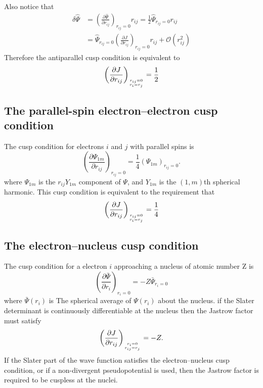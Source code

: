 \documentclass[12pt]{article}
\begin{document}
Also notice that 
\begin{equation}
    \begin{split}
        \delta\hat{\Psi}&=\left(\frac{\partial \hat{\Psi}}{\partial r_{i j}}
        \right)_{r_{i j}=0}r_{ij}=\frac{1}{2} \hat{\Psi}_{r_{i j}=0}r_{ij}\\
        &=\hat{\Psi}_{r_{i j}=0}\left(\frac{\partial J}{\partial r_{i j}}
        \right)_{r_{i j}=0}r_{i j}+\mathcal{O}\left(r_{i j}^{2}\right)
    \end{split}
\end{equation}
Therefore the antiparallel cusp condition is equivalent to
\begin{equation}
    \left(\frac{\partial J}{\partial r_{i j}}\right)_{r_{i j}=0 \atop r_{i}=r_{j}}
    =\frac{1}{2}
\end{equation}
\subsection*{\normalsize The parallel-spin electron–electron cusp condition}
The cusp condition for electrons $i$ and $j$ with parallel spins is 
\begin{equation}\label{3}
    \left(\frac{\partial \Psi_{1 m}}{\partial r_{i j}}\right)_{r_{i j}=0}=
    \frac{1}{4}\left(\Psi_{1 m}\right)_{r_{i j}=0}.
\end{equation}
where $\Psi_{1m}$ is the $r_{ij}Y_{1m}$ component of $\Psi$, and $Y_{1m}$ is the 
$(1,m)$th spherical harmonic.
This cusp condition is equivalent to the requirement that
\begin{equation}
    \left(\frac{\partial J}{\partial r_{i j}}\right)_{r_{i j}=0 
    \atop r_{i}=r_{j}}=\frac{1}{4}
\end{equation}
\subsection*{\normalsize The electron–nucleus cusp condition}

The cusp condition for a electron $i$ approaching a nucleus of atomic number Z is
\begin{equation}
    \left(\frac{\partial\bar{\Psi}}{\partial r_i}\right)_{r_i=0}=-Z\bar{\Psi}_{r_i=0}
\end{equation}
where $\bar{\Psi}(r_i)$ is The spherical average of $\Psi(r_i)$ about the nucleus.
if the Slater determinant is continuously differentiable at the nucleus then the 
Jastrow factor must satisfy
\begin{equation}
    \left(\frac{\partial J}{\partial r_{i j}}\right)_{r_i=0 
    \atop r_{ij}=r_{j}}=-Z.
\end{equation}
If the Slater part of the wave function satisfies the electron–nucleus cusp condition, 
or if a non-divergent pseudopotential is used, then the Jastrow factor is required 
to be cuspless at the nuclei. 
\end{document}
